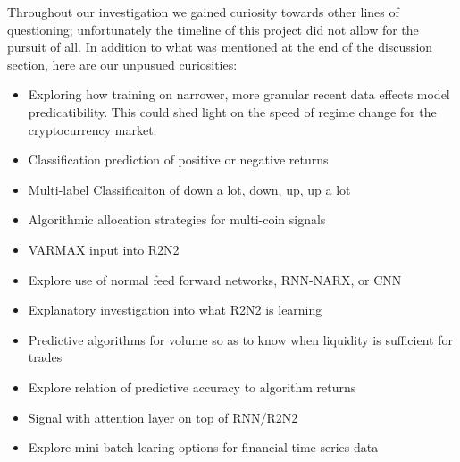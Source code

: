 Throughout our investigation we gained curiosity towards other lines of questioning; unfortunately the timeline of this project did not allow for the pursuit of all. In addition to what was mentioned at the end of the discussion section, here are our unpusued curiosities:

\begin{itemize}

	\item Exploring how training on narrower, more granular recent data effects model predicatibility. This could shed light on the speed of regime change for the cryptocurrency market.

	\item Classification prediction of positive or negative returns

	\item Multi-label Classificaiton of down a lot, down, up, up a lot

	\item Algorithmic allocation strategies for multi-coin signals

	\item VARMAX input into R2N2

	\item Explore use of normal feed forward networks, RNN-NARX, or CNN

	\item Explanatory investigation into what R2N2 is learning

	\item Predictive algorithms for volume so as to know when liquidity is sufficient for trades

	\item Explore relation of predictive accuracy to algorithm returns

	\item Signal with attention layer on top of RNN/R2N2

	\item Explore mini-batch learing options for financial time series data

\end{itemize}